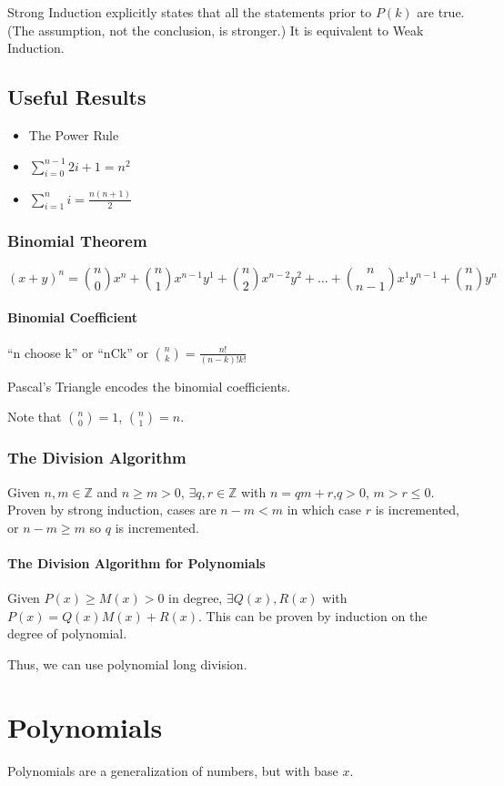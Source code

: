 \documentclass{article}
\begin{document}
Strong Induction explicitly states that all the statements prior to $P(k)$ are true. (The assumption, not the conclusion, is stronger.) It is equivalent to Weak Induction.

\subsection{Useful Results} \label{induction-closed}
\begin{itemize}
    \item The Power Rule
    \item $\sum_{i=0}^{n-1} 2i+1 = n^2$
    \item $\sum_{i=1}^{n} i= \frac{n(n+1)}{2}$
\end{itemize}

\subsubsection{Binomial Theorem}
$$(x+y)^n=\binom{n}{0}x^n + \binom{n}{1}x^{n-1}y^1 + \binom{n}{2}x^{n-2}y^2 + \ldots + \binom{n}{n-1}x^1y^{n-1}+\binom{n}{n}y^n$$

\paragraph{Binomial Coefficient} ``n choose k'' or ``nCk'' or $\binom{n}{k}= \frac{n!}{\left(n-k\right)!k!}$

Pascal's Triangle encodes the binomial coefficients.

Note that $\binom{n}{0}=1$, $\binom{n}{1} = n$.

\subsubsection{The Division Algorithm}
Given $n,m \in \mathbb{Z}$ and $n\ge m > 0$, $\exists q, r \in \mathbb{Z}$ with $n =qm+r$,$q>0$, $m>r\le0$. Proven by strong induction, cases are $n-m<m$ in which case $r$ is incremented, or $n-m \ge m$ so $q$ is incremented.
\
\paragraph{The Division Algorithm for Polynomials}
Given $P(x)\ge M(x) > 0$ in degree, $\exists Q(x), R(x)$ with $P(x) = Q(x)M(x) + R(x)$. This can be proven by induction on the degree of polynomial.

Thus, we can use polynomial long division.

\section{Polynomials}
Polynomials are a generalization of numbers, but with base $x$.
\end{document}
